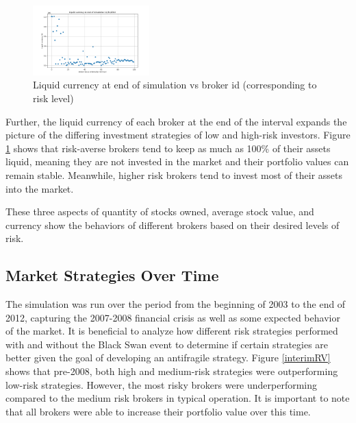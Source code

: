 \documentclass[letterpaper, 11 pt, proceedings]{IEEEtran}
\begin{document}

	\begin{figure}[h]
		\centering
		\includegraphics[width=0.4\textwidth]{liquidCurrency.png}
		\caption{Liquid currency at end of simulation vs broker id (corresponding to risk level)}
		\label{liquidvID}
	\end{figure}
	\FloatBarrier	

	Further, the liquid currency of each broker at the end of the interval expands the picture of the differing investment strategies of low and high-risk investors. Figure \ref{liquidvID} shows that risk-averse brokers tend to keep as much as 100\% of their assets liquid, meaning they are not invested in the market and their portfolio values can remain stable. Meanwhile, higher risk brokers tend to invest most of their assets into the market.
	
	These three aspects of quantity of stocks owned, average stock value, and currency show the behaviors of different brokers based on their desired levels of risk.

	\subsection{Market Strategies Over Time}\label{subsec:results_midpoint}
	The simulation was run over the period from the beginning of 2003 to the end of 2012, capturing the 2007-2008 financial crisis as well as some expected behavior of the market. It is beneficial to analyze how different risk strategies performed with and without the Black Swan event to determine if certain strategies are better given the goal of developing an antifragile strategy. Figure \ref{interimRV} shows that pre-2008, both high and medium-risk strategies were outperforming low-risk strategies. However, the most risky brokers were underperforming compared to the medium risk brokers in typical operation. It is important to note that all brokers were able to increase their portfolio value over this time.
\end{document}
